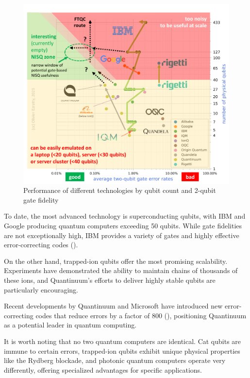 \documentclass{article}
\begin{document}
\begin{multicols}{2}
\begin{figure}[H]
    \centering
    \includegraphics[width = \columnwidth]{fig/NISQ.png}
    \caption{Performance of different technologies by qubit count and 2-qubit gate fidelity}
    \label{fig:nisq}
\end{figure}

To date, the most advanced technology is superconducting qubits, with IBM and Google producing quantum computers exceeding 50 qubits. While gate fidelities are not exceptionally high, IBM provides a variety of gates and highly effective error-correcting codes (\cite{bravyi_high-threshold_2024}).

On the other hand, trapped-ion qubits offer the most promising scalability. Experiments have demonstrated the ability to maintain chains of thousands of these ions, and Quantinuum’s efforts to deliver highly stable qubits are particularly encouraging.

Recent developments by Quantinuum and Microsoft have introduced new error-correcting codes that reduce errors by a factor of 800 (\cite{zander_advancing_2024}), positioning Quantinuum as a potential leader in quantum computing.

It is worth noting that no two quantum computers are identical. Cat qubits are immune to certain errors, trapped-ion qubits exhibit unique physical properties like the Rydberg blockade, and photonic quantum computers operate very differently, offering specialized advantages for specific applications.


\end{multicols}
\end{document}
